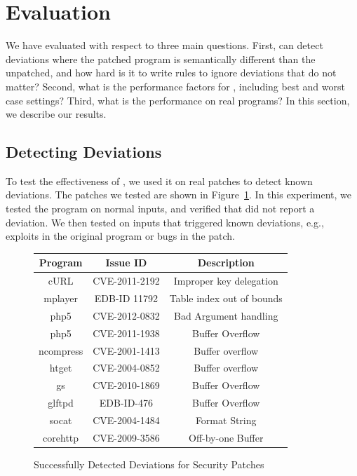\section{Evaluation}
\label{tach:sec:eval}

We have evaluated \tachyon with respect to three main
questions. First, can \tachyon detect deviations where the patched
program is semantically different than the unpatched, and how hard is
it to write rules to ignore deviations that do not matter? Second,
what is the performance factors for \tachyon, including best and worst
case settings? Third, what is the performance on real programs?  In
this section, we describe our results.

\subsection{Detecting Deviations}

To test the effectiveness of \tachyon, we used it on real patches
to detect known deviations.  The patches we tested are shown in
Figure~\ref{tach:fig:bug}. In this experiment, we tested the program on
normal inputs, and verified that \tachyon did not report a
deviation. We then tested on inputs that triggered known deviations,
e.g., exploits in the original program or bugs in the patch.

\begin{figure}
	\begin{center}
	\begin{footnotesize}
\begin{tabular}{|c|c|c|}
\hline
Program & Issue ID & Description\\
\hline \hline
cURL & CVE-2011-2192 & Improper key delegation\\
\hline
mplayer & EDB-ID 11792 & Table index out of bounds \\
\hline
php5 & CVE-2012-0832 & Bad Argument handling \\
\hline
php5 & CVE-2011-1938 & Buffer Overflow\\
\hline
ncompress & CVE-2001-1413 & Buffer overflow \\
\hline
htget & CVE-2004-0852 & Buffer overflow \\
\hline
gs & CVE-2010-1869 & Buffer Overflow\\
\hline
glftpd & EDB-ID-476 & Buffer Overflow\\
\hline
socat & CVE-2004-1484 & Format String\\
\hline
corehttp & CVE-2009-3586 & Off-by-one Buffer\\
\hline


\end{tabular}
\end{footnotesize}
\caption{Successfully Detected Deviations for Security Patches}
\label{tach:fig:bug}
	\end{center}
\end{figure}

